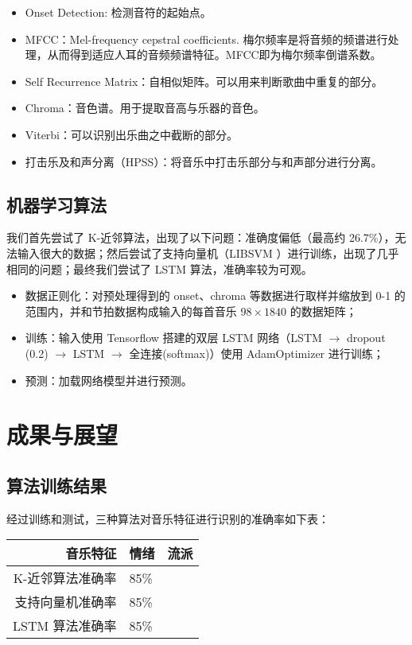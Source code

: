\documentclass[a4paper,utf8,10pt]{article}
\newcommand{\sept}{\setlength\itemsep{-4pt}}
\begin{document}
\noindent\begin{itemize}
  \sept
  \item Onset Detection: 检测音符的起始点。
  \item MFCC：Mel-frequency cepstral coefficients. 梅尔频率是将音频的频谱进行处理，从而得到适应人耳的音频频谱特征。MFCC即为梅尔频率倒谱系数。
  \item Self Recurrence Matrix：自相似矩阵。可以用来判断歌曲中重复的部分。
  \item Chroma：音色谱。用于提取音高与乐器的音色。
  \item Viterbi：可以识别出乐曲之中截断的部分。
  \item 打击乐及和声分离（HPSS）：将音乐中打击乐部分与和声部分进行分离。
\end{itemize}

\subsection{机器学习算法}

我们首先尝试了 K-近邻算法，出现了以下问题：准确度偏低（最高约 26.7\%），无法输入很大的数据；然后尝试了支持向量机（LIBSVM \cite{CC01a}）进行训练，出现了几乎相同的问题；最终我们尝试了 LSTM 算法，准确率较为可观。

\noindent\begin{itemize}
  \sept
  \item 数据正则化：对预处理得到的 onset、chroma 等数据进行取样并缩放到 0-1 的范围内，并和节拍数据构成输入的每首音乐 $98\times 1840$ 的数据矩阵；
  \item 训练：输入使用 Tensorflow 搭建的双层 LSTM 网络（LSTM $\rightarrow$ dropout (0.2) $\rightarrow$ LSTM $\rightarrow$ 全连接(softmax)）使用 AdamOptimizer 进行训练；
  \item 预测：加载网络模型并进行预测。
\end{itemize}

\section{成果与展望}
\subsection{算法训练结果}
经过训练和测试，三种算法对音乐特征进行识别的准确率如下表：

\begin{center}
\begin{tabular}{ r | l | l }
\hline
        音乐特征 & 情绪 & 流派 \\ \hline
K-近邻算法准确率 & 85\% &      \\ \hline
支持向量机准确率 & 85\% &      \\ \hline
 LSTM 算法准确率 & 85\% &      \\ \hline
\end{tabular}
\end{center}
\end{document}
